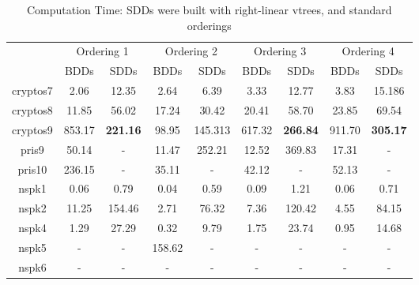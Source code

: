 \documentclass[11pt]{article}
\begin{document}
\begin{table}
\centering
\begin{tabular}{|*{9}{c|}}
\hline
 & \multicolumn{2}{|c|}{Ordering 1} & \multicolumn{2}{|c|}{Ordering 2} & \multicolumn{2}{|c|}{Ordering 3} & \multicolumn{2}{|c|}{Ordering 4}\\
\cline{2-9}
& BDDs & SDDs & BDDs & SDDs & BDDs & SDDs & BDDs & SDDs\\ \hline
cryptos7 & 2.06 & 12.35 & 2.64 &  6.39 & 3.33 & 12.77 & 3.83 & 15.186 \\ \hline
cryptos8 & 11.85 & 56.02 & 17.24 & 30.42 & 20.41 & 58.70 & 23.85 & 69.54 \\ \hline
cryptos9 & 853.17 & \textbf{221.16} & 98.95 & 145.313 & 617.32 & \textbf{266.84} & 911.70 & \textbf{305.17} \\ \hline
pris9 & 50.14 & - & 11.47 & 252.21 & 12.52 & 369.83 & 17.31 & - \\ \hline
pris10 & 236.15 & - & 35.11 & - & 42.12 & -& 52.13 & -\\ \hline
nspk1 & 0.06 & 0.79 & 0.04 & 0.59 & 0.09 & 1.21 & 0.06 & 0.71 \\ \hline
nspk2 & 11.25 & 154.46 & 2.71 & 76.32 & 7.36 & 120.42 & 4.55& 84.15 \\ \hline
nspk4 & 1.29 & 27.29 & 0.32 & 9.79 & 1.75 & 23.74 & 0.95 & 14.68 \\ \hline
nspk5 & - & - & 158.62 & - & - & - & - & - \\ \hline
nspk6 & - & - & - &- & - & - & - & - \\ \hline
\end{tabular}
\\
\caption{Computation Time: SDDs were built with right-linear vtrees, and standard orderings}
\label{table:rightlineartime}
\end{table}
\end{document}
